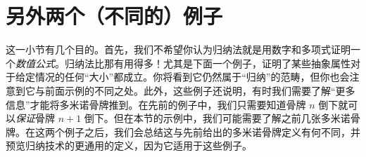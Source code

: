 \section{另外两个（不同的）例子} \label{sec:section2.4}

这一小节有几个目的。首先，我们不希望你认为归纳法就是用数字和多项式证明一个\emph{数值公式}。归纳法比那有用得多！尤其是下面一个例子，证明了某些抽象属性对于给定情况的任何``大小''都成立。你将看到它仍然属于``归纳''的范畴，但你也会注意到它与前面示例的不同之处。此外，这些例子还说明，有时我们需要了解``更多信息''才能将多米诺骨牌推到。在先前的例子中，我们只需要知道骨牌 $n$ 倒下就可以\emph{保证}骨牌 $n + 1$ 倒下。但在本节的示例中，我们可能需要了解之前几张多米诺骨牌。在这两个例子之后，我们会总结这与先前给出的多米诺骨牌定义有何不同，并预览归纳技术的更通用的定义，因为它适用于这些例子。





